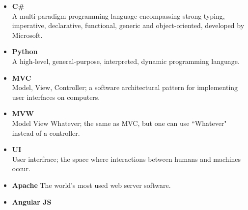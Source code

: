 \begin{itemize}
\item \textbf{C\#}\\
A multi-paradigm programming language encompassing strong typing, imperative, declarative, functional, generic and object-oriented,  developed by Microsoft.
\item \textbf{Python}\\
A high-level, general-purpose, interpreted, dynamic programming language.
\item \textbf{MVC}\\
Model, View, Controller; a software architectural pattern for implementing user interfaces on computers.
\item \textbf{MVW}\\
Model View Whatever; the same as MVC, but one can use ``Whatever" instead of a controller.
\item \textbf{UI}\\
User interfrace; the space where interactions between humans and machines occur.
\item \textbf{Apache}
The world's most used web server software.
\item \textbf{Angular JS}


\end{itemize}

